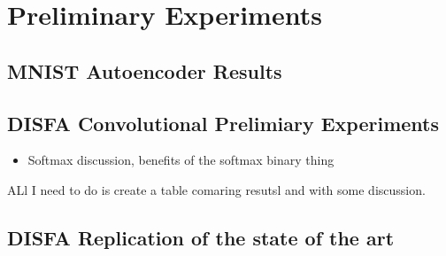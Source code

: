 \section{Preliminary Experiments}
\subsection{MNIST Autoencoder Results}
\subsection{DISFA Convolutional Prelimiary Experiments}
\begin{itemize}
  \item Softmax discussion, benefits of the softmax binary thing
\end{itemize}
ALl I need to do is create a table comaring resutsl and with some discussion.


\subsection{DISFA Replication of the state of the art}
